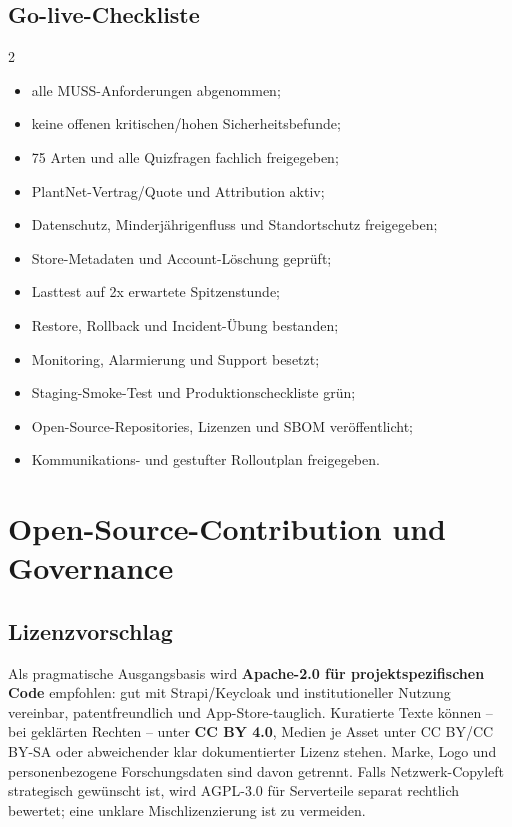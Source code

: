 \documentclass[10pt,a4paper,oneside]{article}
\begin{document}
\subsection{Go-live-Checkliste}

\begin{multicols}{2}
\begin{itemize}
  \item alle MUSS-Anforderungen abgenommen;
  \item keine offenen kritischen/hohen Sicherheitsbefunde;
  \item 75 Arten und alle Quizfragen fachlich freigegeben;
  \item PlantNet-Vertrag/Quote und Attribution aktiv;
  \item Datenschutz, Minderjährigenfluss und Standortschutz freigegeben;
  \item Store-Metadaten und Account-Löschung geprüft;
  \item Lasttest auf 2x erwartete Spitzenstunde;
  \item Restore, Rollback und Incident-Übung bestanden;
  \item Monitoring, Alarmierung und Support besetzt;
  \item Staging-Smoke-Test und Produktionscheckliste grün;
  \item Open-Source-Repositories, Lizenzen und SBOM veröffentlicht;
  \item Kommunikations- und gestufter Rolloutplan freigegeben.
\end{itemize}
\end{multicols}

\section{Open-Source-Contribution und Governance}\label{sec:oss-governance}

\subsection{Lizenzvorschlag}

Als pragmatische Ausgangsbasis wird \textbf{Apache-2.0 für projektspezifischen Code} empfohlen: gut mit Strapi/Keycloak und institutioneller Nutzung vereinbar, patentfreundlich und App-Store-tauglich. Kuratierte Texte können -- bei geklärten Rechten -- unter \textbf{CC BY 4.0}, Medien je Asset unter CC BY/CC BY-SA oder abweichender klar dokumentierter Lizenz stehen. Marke, Logo und personenbezogene Forschungsdaten sind davon getrennt. Falls Netzwerk-Copyleft strategisch gewünscht ist, wird AGPL-3.0 für Serverteile separat rechtlich bewertet; eine unklare Mischlizenzierung ist zu vermeiden.
\end{document}
